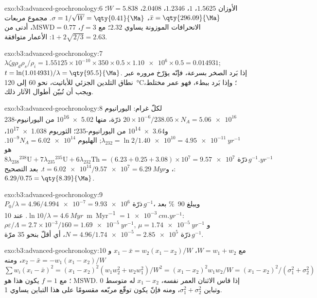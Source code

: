 \begin{solution}{exo:b3:advanced-geochronology:6}
الأوزان $1.5625$، $1$، $1.2346$، $2.0408$، $W = 5.838$؛ $\bar x =
\qty{296.09}{\Ma}$، $\sigma = 1/\sqrt W = \qty{0.41}{\Ma}$. مجموع مربعات
الانحرافات الموزونة يساوي $2.32$؛ مع $f = 3$، $\mathrm{MSWD} = 0.77$، أدنى من
$1 + 2\sqrt{2/3} = 2.63$: الأعمار متوافقة.
\end{solution}

\begin{solution}{exo:b3:advanced-geochronology:7}
$\lambda\zeta g\rho_d\rho_s/\rho_i = 1.55125\times10^{-10}\times350\times0.5
\times\num{1.10e6}\times0.5 = 0.014931$; $t = \ln(1.014931)/\lambda =
\qty{95.5}{\Ma}$. إذا بَرد الصخر بسرعة، فإنّه يؤرّخ مروره عبر
نطاق التلدين الجزئي للأباتيت، نحو 60 إلى \qty{120}{\celsius}؛ وإذا
بَرد ببطء، فهو عمر مختلط، ويجب أن تُبيّن أطوال الآثار ذلك.
\end{solution}

\begin{solution}{exo:b3:advanced-geochronology:8}
لكلّ غرام: اليورانيوم $20\times10^{-6}/238.05\times N_A = \num{5.06e16}$ ذرّة، منها
\num{5.02e16} من اليورانيوم-238 و\num{3.64e14} من اليورانيوم-235؛ الثوريوم
\num{1.038e17}، $\lambda_{232} = \ln 2/\num{1.40e10} = \qty{4.95e-11}{yr^{-1}}$;
الهليوم $10^{-9}N_A = \num{6.02e14}$.  هو
$8\lambda_{238}{}^{238}\mathrm U + 7\lambda_{235}{}^{235}\mathrm U +
6\lambda_{232}\mathrm{Th} = (6.23 + 0.25 + 3.08)\times10^7 =
\num{9.57e7}\text{ ذرّة}\,\unit{g^{-1}.yr^{-1}}$، و$t = \num{6.02e14}/\num{9.57e7} =
\qty{6.29}{Myr}$. بعد التصحيح: $6.29/0.75 = \qty{8.39}{\Ma}$.
\end{solution}

\begin{solution}{exo:b3:advanced-geochronology:9}
$P_0/\lambda = 4.96/\num{4.994e-7} = \num{9.93e6}\text{ ذرّة}\,\unit{g^{-1}}$، ويبلغ
\qty{90}{\percent} بعد $\ln 10/\lambda = \qty{4.6}{Myr}$. عند
\qty{10}{m.Myr^{-1}} $= \qty{1e-3}{cm.yr^{-1}}$: $\rho\varepsilon/\Lambda =
2.7\times10^{-3}/160 = \qty{1.69e-5}{yr^{-1}}$, $\mu = \qty{1.74e-5}{yr^{-1}}$
و$N = 4.96/\num{1.74e-5} = \num{2.85e5}\text{ ذرّة}\,\unit{g^{-1}}$، أي أقلّ بنحو 35 مرّة.
\end{solution}

\begin{solution}{exo:b3:advanced-geochronology:10}
مع $W = w_1 + w_2$، $x_1 - \bar x = w_2(x_1 - x_2)/W$ و$x_2 - \bar x =
-w_1(x_1 - x_2)/W$، ومنه $\sum w_i(x_i - \bar x)^2 = (x_1 - x_2)^2(w_1w_2^2 +
w_2w_1^2)/W^2 = (x_1 - x_2)^2w_1w_2/W = (x_1 - x_2)^2/(\sigma_1^2 +
\sigma_2^2)$؛ مع $f = 1$ يكون هذا هو MSWD. إذا قاس الاثنان العمر نفسه،
$x_1 - x_2$ له متوسط 0 وتباين $\sigma_1^2 + \sigma_2^2$، ومنه فإنّ
يكون توقّع مربّعه مقسومًا على هذا التباين يساوي 1.
\end{solution}

